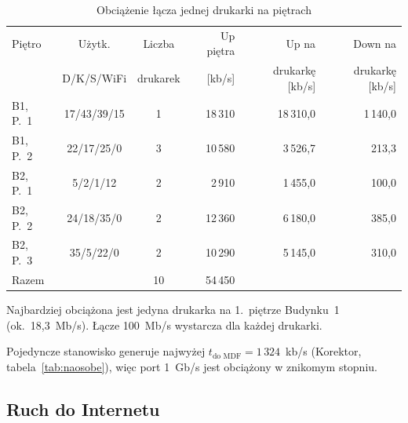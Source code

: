 \documentclass[12pt,a4paper]{article}
\begin{document}
\begin{table}[htbp]
\centering
\caption{Obciążenie łącza jednej drukarki na piętrach}
\label{tab:drukarki}
\small
\begin{tabular}{lccrrr}
\toprule
Piętro & Użytk. & Liczba & Up piętra & Up na & Down na \\
 & D/K/S/WiFi & drukarek & [kb/s] & drukarkę [kb/s] & drukarkę [kb/s] \\
\midrule
B1, P.~1 & 17/43/39/15 & 1 & 18\,310 & 18\,310{,}0 & 1\,140{,}0 \\
B1, P.~2 & 22/17/25/0  & 3 & 10\,580 &  3\,526{,}7 &   213{,}3 \\
B2, P.~1 & 5/2/1/12    & 2 &  2\,910 &  1\,455{,}0 &   100{,}0 \\
B2, P.~2 & 24/18/35/0  & 2 & 12\,360 &  6\,180{,}0 &   385{,}0 \\
B2, P.~3 & 35/5/22/0   & 2 & 10\,290 &  5\,145{,}0 &   310{,}0 \\
\midrule
Razem    &             & 10 & 54\,450 & & \\
\bottomrule
\end{tabular}
\end{table}

Najbardziej obciążona jest jedyna drukarka na 1.~piętrze Budynku~1
(ok.\ 18{,}3~Mb/s). Łącze 100~Mb/s wystarcza dla każdej drukarki.

Pojedyncze stanowisko generuje najwyżej $t_\text{do MDF} = 1\,324$~kb/s
(Korektor, tabela~\ref{tab:naosobe}), więc port 1~Gb/s jest obciążony
w znikomym stopniu.

\subsection{Ruch do Internetu}
\end{document}
